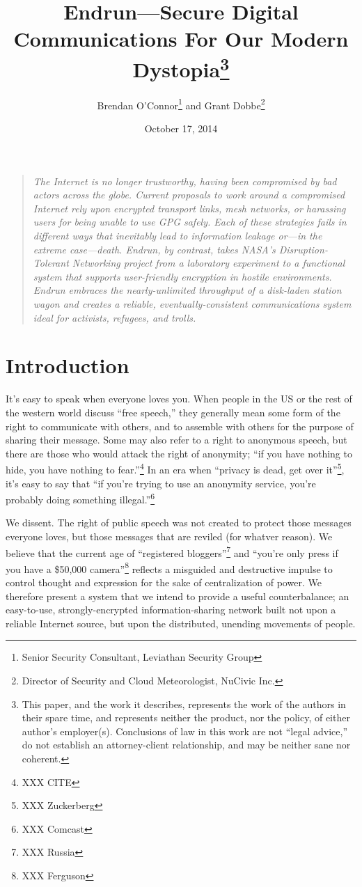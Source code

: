 \documentclass[12pt]{article}
\title{Endrun---Secure Digital Communications For Our Modern Dystopia\footnote{This paper, and the work it describes, represents the work of the authors in their spare time, and represents neither the product, nor the policy, of either author's employer(s). Conclusions of law in this work are not ``legal advice,'' do not establish an attorney-client relationship, and may be neither sane nor coherent.}}
\author{Brendan O'Connor\footnote{Senior Security Consultant, Leviathan Security Group} and Grant Dobbe\footnote{Director of Security and Cloud Meteorologist, NuCivic Inc.}}
\date{October 17, 2014}
\begin{document}
	
	
	\maketitle
  
  \begin{quote}
    \emph{The Internet is no longer trustworthy, having been compromised by bad actors across the globe. Current proposals to work around a compromised Internet rely upon encrypted transport links, mesh networks, or harassing users for being unable to use GPG safely. Each of these strategies fails in different ways that inevitably lead to information leakage or---in the extreme case---death. Endrun, by contrast, takes NASA's Disruption-Tolerant Networking project from a laboratory experiment to a functional system that supports user-friendly encryption in hostile environments. Endrun embraces the nearly-unlimited throughput of a disk-laden station wagon and creates a reliable, eventually-consistent communications system ideal for activists, refugees, and trolls.}
    \end{quote}
	
	\section{Introduction}
	
  It's easy to speak when everyone loves you. When people in the US or the rest of the western world discuss ``free speech,'' they generally mean some form of the right to communicate with others, and to assemble with others for the purpose of sharing their message. Some may also refer to a right to anonymous speech, but there are those who would attack the right of anonymity; ``if you have nothing to hide, you have nothing to fear.''\footnote{XXX CITE} In an era when ``privacy is dead, get over it''\footnote{XXX Zuckerberg}, it's easy to say that ``if you're trying to use an anonymity service, you're probably doing something illegal.''\footnote{XXX Comcast}
  
  We dissent. The right of public speech was not created to protect those messages everyone loves, but those messages that are reviled (for whatver reason). We believe that the current age of ``registered bloggers''\footnote{XXX Russia} and ``you're only press if you have a \$50,000 camera''\footnote{XXX Ferguson} reflects a misguided and destructive impulse to control thought and expression for the sake of centralization of power. We therefore present a system that we intend to provide a useful counterbalance; an easy-to-use, strongly-encrypted information-sharing network built not upon a reliable Internet source, but upon the distributed, unending movements of people. 
  
\end{document}
